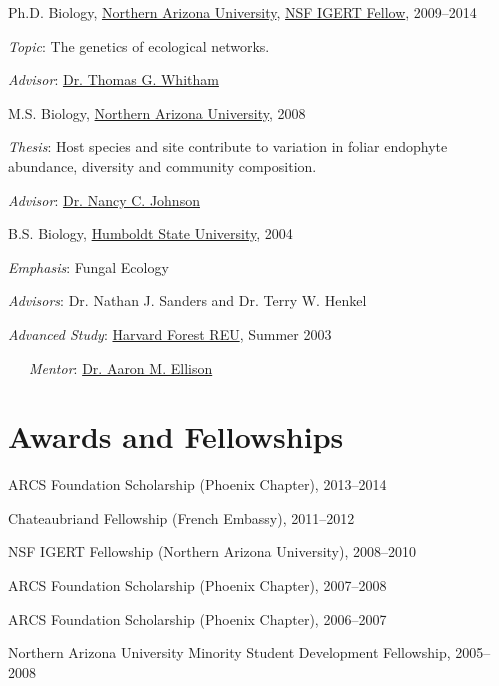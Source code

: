 \documentclass[letterpaper]{article}
\renewenvironment{itemize}{
  \begin{list}{}{
    \setlength{\leftmargin}{1em}
  }
}{
  \end{list}
}
\begin{document}
\begin{itemize}
  \item Ph.D. Biology, \href{http://www.nau.edu}{Northern Arizona
    University}, \href{http://www.mpcer.nau.edu/igert/}{NSF IGERT
    Fellow}, 2009--2014
    \begin{itemize}
    \item \textit{Topic}: The genetics of ecological networks.
    \item \textit{Advisor}:
      \href{http://www6.nau.edu/biology/People/Faculty/Whitham/Whitham.htm}{Dr. Thomas G. Whitham} 
    \end{itemize}

  \item M.S. Biology, \href{http://www.nau.edu}{Northern Arizona University}, 2008
	\begin{itemize}
    \item \textit{Thesis}: Host species and site contribute to variation in foliar endophyte abundance, diversity and community composition.
    \item \textit{Advisor}: \href{http://www.nau.edu/~envsci/johnsonlab/index.htm}{Dr. Nancy C. Johnson}
	\end{itemize}

  \item B.S. Biology, \href{http://www.humboldt.edu/~biosci/}{Humboldt State University}, 2004
    \begin{itemize}
    \item \textit{Emphasis}: Fungal Ecology
    \item \textit{Advisors}: Dr. Nathan J. Sanders and Dr. Terry W. Henkel
    \item \textit{Advanced Study}:
      \href{http://harvardforest.fas.harvard.edu/education/reu/reu.html}{Harvard
        Forest REU}, Summer 2003
    \item \ \ \  \textit{Mentor}: \href{http://harvardforest.fas.harvard.edu/profiles/ellison.html}{Dr. Aaron M. Ellison} 
    \end{itemize}

\end{itemize}

\section{Awards and Fellowships}

\begin{itemize}
\item ARCS Foundation Scholarship (Phoenix Chapter), 2013--2014
\item Chateaubriand Fellowship (French Embassy), 2011--2012
\item NSF IGERT Fellowship (Northern Arizona University), 2008--2010
\item ARCS Foundation Scholarship (Phoenix Chapter), 2007--2008
\item ARCS Foundation Scholarship (Phoenix Chapter), 2006--2007
\item Northern Arizona University Minority Student Development Fellowship, 2005--2008
\end{itemize}
\end{document}

